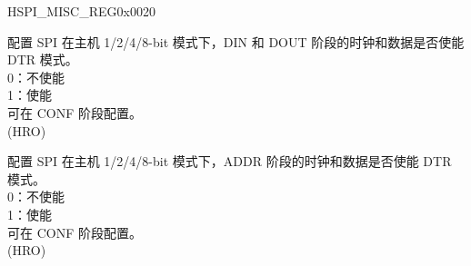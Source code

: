\begin{register}{H}{SPI\_MISC\_REG}{0x0020}
\begin{regdesc}
\begin{reglist}
\label{fielddesc:SPIDATADTREN}\item [SPI\_DATA\_DTR\_EN] 配置 SPI 在主机 1/2/4/8-bit 模式下，DIN 和 DOUT 阶段的时钟和数据是否使能 DTR 模式。\\
0：不使能\\
1：使能\\
可在 CONF 阶段配置。\\
(HRO)
\label{fielddesc:SPIADDRDTREN}\item [SPI\_ADDR\_DTR\_EN] 配置 SPI 在主机 1/2/4/8-bit 模式下，ADDR 阶段的时钟和数据是否使能 DTR 模式。\\
0：不使能\\
1：使能\\
可在 CONF 阶段配置。\\
(HRO)

\item [见下页]
\end{reglist}\end{regdesc}
\end{register}

